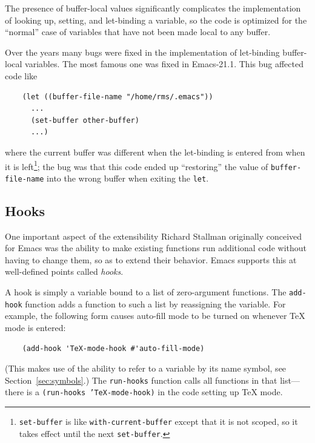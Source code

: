 \documentclass[format=acmsmall, review]{acmart}
\begin{document}
The presence of buffer-local values significantly complicates the
implementation of looking up, setting, and let-binding a variable, so the
code is optimized for the ``normal'' case of variables that have not been
made local to any buffer.

Over the years many bugs were fixed in the implementation of let-binding
buffer-local variables.  The most famous one was fixed in Emacs-21.1.
This bug affected code like
\begin{verbatim}
    (let ((buffer-file-name "/home/rms/.emacs"))
      ...
      (set-buffer other-buffer)
      ...)
\end{verbatim}
where the current buffer was different when the let-binding is entered from
when it is left\footnote{\texttt{set-buffer} is like
  \texttt{with-current-buffer} except that it is not scoped, so it takes
  effect until the next \texttt{set-buffer}.}; the bug was that this code
ended up ``restoring'' the value of \texttt{buffer-file-name} into the
wrong buffer when exiting the \texttt{let}.

\subsection{Hooks}
\label{sec:hooks}

One important aspect of the extensibility Richard Stallman originally
conceived for Emacs was the ability to make existing functions run
additional code without having to change them, so as to extend their
behavior.  Emacs supports this at well-defined points called
\emph{hooks}.

A hook is simply a variable bound to a list of zero-argument
functions.  The \texttt{add-hook} function adds a function to such a
list by reassigning the variable.  For example, the following form
causes auto-fill mode to be turned on whenever \TeX{} mode is entered:
%
\begin{verbatim}
    (add-hook 'TeX-mode-hook #'auto-fill-mode)
\end{verbatim}

(This makes use of the ability to refer to a variable by its name
symbol, see Section~\ref{sec:symbols}.)  The \texttt{run-hooks} function calls all functions in that
list---there is a \texttt{(run-hooks 'TeX-mode-hook)} in the code
setting up \TeX{} mode.
\end{document}
